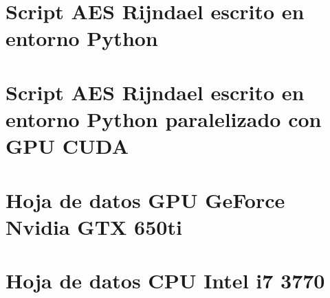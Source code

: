 \documentclass[../main/main.tex]{subfiles}
\begin{document}
\espacio

\tocless\section{Script AES Rijndael escrito en entorno Python}\label{anexo:script_aes_original}\hfill


\clearpage

\tocless\section{Script AES Rijndael escrito en entorno Python paralelizado con GPU CUDA}\label{anexo:script_aes_modificado}\hfill


\clearpage

\tocless\section{Hoja de datos GPU GeForce Nvidia GTX 650ti}\label{anexo:gtx_650ti_datasheet}\hfill


\clearpage

\tocless\section{Hoja de datos CPU Intel i7 3770}\label{anexo:i7_3770_datasheet}\hfill

\end{document}
